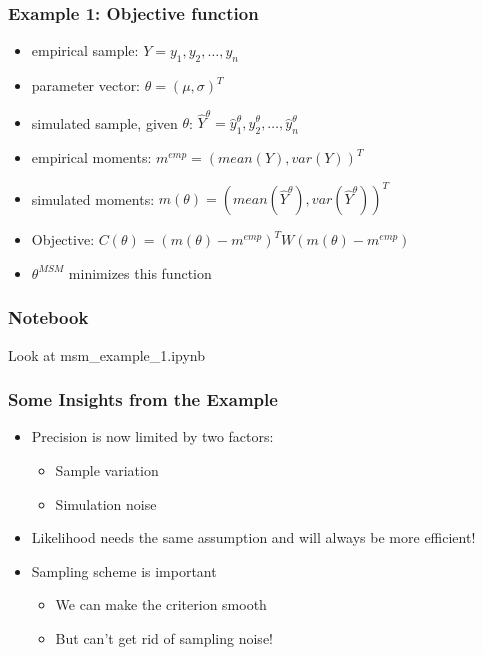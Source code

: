 \documentclass[11pt]{beamer}
\begin{document}
\begin{frame}[c]\frametitle{Example 1: Objective function}
    \begin{itemize}
         \item empirical sample: $Y = y_1, y_2, \ldots, y_n$
         \item parameter vector: $\theta = (\mu, \sigma)^T$
         \item simulated sample, given $\theta$: $\hat{Y}^{\theta} = \hat{y}_1^{\theta}, \hat{y}_2^{\theta}, \ldots, \hat{y}_n^{\theta}$
         \item empirical moments: $m^{emp} = (mean(Y), var(Y))^T$
         \item simulated moments:  $m(\theta) = (mean(\hat{Y}^{\theta}), var(\hat{Y}^{\theta}))^T$
         \item Objective: $C(\theta) = (m(\theta) - m^{emp})^T W (m(\theta) - m^{emp})$
         \item $\theta^{MSM}$ minimizes this function
     \end{itemize}
\end{frame}



\begin{frame}[c]\frametitle{Notebook}
    Look at msm\_example\_1.ipynb
\end{frame}


\begin{frame}[c]\frametitle{Some Insights from the Example}
    \begin{itemize}
        \item Precision is now limited by two factors:
        \begin{itemize}
            \item Sample variation
            \item Simulation noise
        \end{itemize}
        \item Likelihood needs the same assumption and will always be more efficient!
        \item Sampling scheme is important
        \begin{itemize}
            \item We can make the criterion smooth
            \item But can't get rid of sampling noise!
        \end{itemize}
    \end{itemize}
\end{frame}
\end{document}
